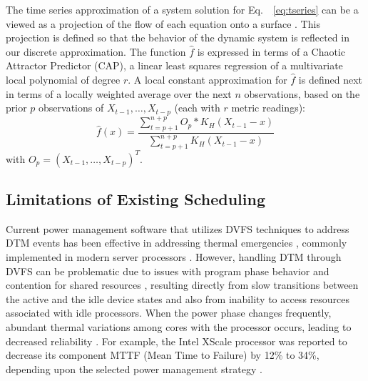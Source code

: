 \documentclass[times, 10pt,twocolumn]{IEEEtran}
\newcommand{\equationname}{Eq.\ }
\begin{document}
The time series approximation of a system solution for
\equationname~\eqref{eq:tseries} can be a viewed as a projection of the
flow of each equation onto a surface \cite{Liu2010}.  This projection is
defined so that the behavior of the dynamic system is reflected in our
discrete approximation.  The function $\hat{f}$ is expressed in terms of
a Chaotic Attractor Predictor (CAP), a linear least squares regression
of a multivariate local polynomial of degree $r$. A local constant
approximation for $\hat{f}$ is defined next in terms of a locally
weighted average \cite{Box1994} over the next $n$ observations, based on
the prior $p$ observations of $X_{t-1}, \ldots, X_{t-p}$ (each with $r$
metric readings):
\begin{equation}
\label{eq:fhatest}
    \hat{f}(x)=\dfrac{\displaystyle\sum_{t=p+1}^{n+p}O_{p}*K_{H}(X_{t-1}-x)}{\displaystyle\sum_{t=p+1}^{n+p}K_{H}(X_{t-1}-x)}
\end{equation}
with $O_{p}=(X_{t-1},\ldots,X_{t-p})^{T}$. 


\subsection{Limitations of Existing Scheduling}
\label{sec:shortc-comp-workl}
Current power management software that utilizes DVFS techniques to address DTM
events has been effective in addressing thermal emergencies
\cite{Donald2006,Hanson2007}, commonly implemented in modern server
processors \cite{AMD2007,Intel2009}.
However, handling DTM through DVFS can be problematic due to issues with
program phase behavior and contention for shared resources
\cite{Bircher2008,Coskun2008d}, resulting directly from
slow transitions between the active and the idle device states
and also from inability to access resources associated with idle processors.
When the power phase changes frequently, abundant thermal variations among cores
with the processor occurs, leading to decreased reliability \cite{Rosing2007,Coskun2008d,Kursun2009}.  For example, the Intel XScale processor was reported to decrease
its component MTTF (Mean Time to Failure) by 12\% to 34\%,
depending upon the selected power management strategy \cite{Rosing2007}. 
\end{document}
